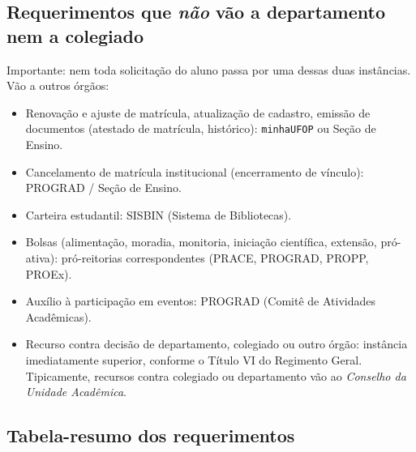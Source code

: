 \documentclass[10pt,a4paper]{extarticle}
\newcommand{\impt}[1]{\textcolor{important}{#1}}
\begin{document}
\subsection{Requerimentos que \emph{não} vão a departamento nem a colegiado}

Importante: nem toda solicitação do aluno passa por uma dessas duas instâncias. Vão a outros órgãos:

\begin{itemize}
    \item \impt{Renovação e ajuste de matrícula}, \impt{atualização de cadastro}, \impt{emissão de documentos} (atestado de matrícula, histórico): \texttt{minhaUFOP} ou Seção de Ensino.
    \item \impt{Cancelamento de matrícula institucional} (encerramento de vínculo): PROGRAD / Seção de Ensino.
    \item \impt{Carteira estudantil}: SISBIN (Sistema de Bibliotecas).
    \item \impt{Bolsas} (alimentação, moradia, monitoria, iniciação científica, extensão, pró-ativa): pró-reitorias correspondentes (PRACE, PROGRAD, PROPP, PROEx).
    \item \impt{Auxílio à participação em eventos}: PROGRAD (Comitê de Atividades Acadêmicas).
    \item \impt{Recurso contra decisão} de departamento, colegiado ou outro órgão: instância imediatamente superior, conforme o Título VI do Regimento Geral. Tipicamente, recursos contra colegiado ou departamento vão ao \emph{Conselho da Unidade Acadêmica}.
\end{itemize}

\subsection{Tabela-resumo dos requerimentos}
\end{document}
